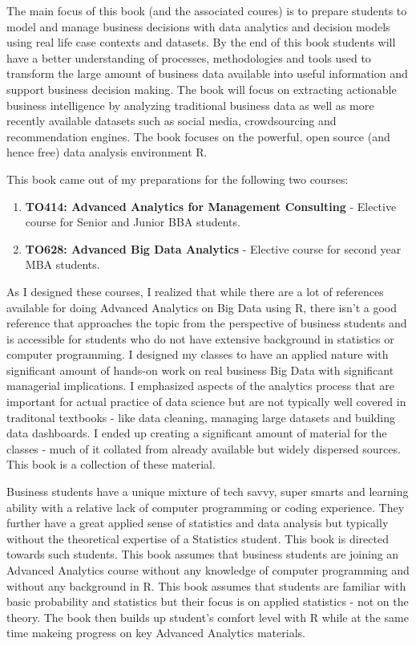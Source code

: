 \documentclass[11pt, letterpaper, twoside]{memoir}\usepackage{knitr}
\begin{document}
The main focus of this book (and the associated coures) is to prepare students to model and manage business decisions with data analytics and decision models using real life case contexts and datasets. By the end of this book students will have a better understanding of processes, methodologies and tools used to transform the large amount of business data available into useful information and support business decision making. The book will focus on extracting actionable business intelligence by analyzing traditional business data as well as more recently available datasets such as social media, crowdsourcing and recommendation engines. The book focuses on the powerful, open source (and hence free) data analysis environment R. 

This book came out of my preparations for the following two courses:
\begin{enumerate}
\item \textbf{TO414: Advanced Analytics for Management Consulting} - Elective course for Senior and Junior BBA students. 
\item \textbf{TO628: Advanced Big Data Analytics} - Elective course for second year MBA students.
\end{enumerate}

As I designed these courses, I realized that while there are a lot of references available for doing Advanced Analytics on Big Data using R, there isn't a good reference that approaches the topic from the perspective of business students and is accessible for students who do not have extensive background in statistics or computer programming. I designed my classes to have an applied nature with significant amount of hands-on work on real business Big Data with significant managerial implications. I emphasized aspects of the analytics process that are important for actual practice of data science but are not typically well covered in traditonal textbooks - like data cleaning, managing large datasets and building data dashboards. I ended up creating a significant amount of material for the classes - much of it collated from already available but widely dispersed sources. This book is a collection of these material.

Business students have a unique mixture of tech savvy, super smarts and learning ability with a relative lack of computer programming or coding experience. They further have a great applied sense of statistics and data analysis but typically without the theoretical expertise of a Statistics student. This book is directed towards such students. This book assumes that business students are joining an Advanced Analytics course without any knowledge of computer programming and without any background in R. This book assumes that students are familiar with basic probability and statistics but their focus is on applied statistics - not on the theory. The book then builds up student's comfort level with R while at the same time makeing progress on key Advanced Analytics materials.
\end{document}
